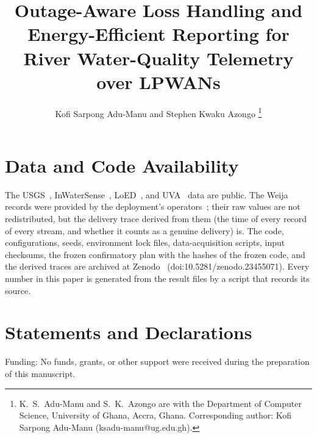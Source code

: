 \documentclass[journal]{IEEEtran}
\begin{document}
\title{Outage-Aware Loss Handling and Energy-Efficient Reporting for River Water-Quality Telemetry over LPWANs}

\author{Kofi Sarpong Adu-Manu and Stephen Kwaku Azongo
\thanks{K.~S.~Adu-Manu and S.~K.~Azongo are with the Department of Computer Science, University of Ghana, Accra, Ghana. Corresponding author: Kofi Sarpong Adu-Manu (ksadu-manu@ug.edu.gh).}}

\maketitle











\section*{Data and Code Availability}
The USGS~\cite{usgs2023nwis}, InWaterSense~\cite{ahmedi2021inwatersense}, LoED~\cite{bhatia2020loeddata}, and UVA~\cite{nikseresht2025uvadata} data are public. The Weija records were provided by the deployment's operators~\cite{adumanu2020smart}; their raw values are not redistributed, but the delivery trace derived from them (the time of every record of every stream, and whether it counts as a genuine delivery) is. The code, configurations, seeds, environment lock files, data-acquisition scripts, input checksums, the frozen confirmatory plan with the hashes of the frozen code, and the derived traces are archived at Zenodo~\cite{azongo2026code} (doi:10.5281/zenodo.23455071). Every number in this paper is generated from the result files by a script that records its source.

\section*{Statements and Declarations}
Funding: No funds, grants, or other support were received during the preparation of this manuscript.



\end{document}
